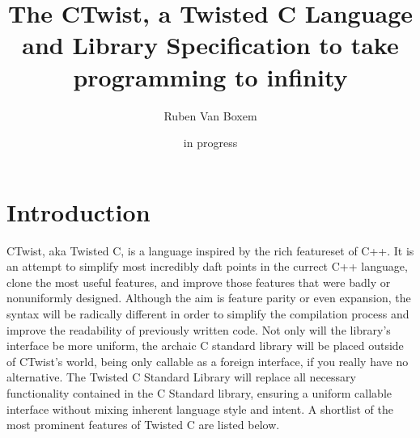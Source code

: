 \documentclass[a4paper,11pt]{article}
\title{The CTwist, a Twisted C Language and Library Specification to take programming to infinity}
\date{in progress}
\author{Ruben Van Boxem}
\begin{document}
\maketitle

\newpage

\tableofcontents
\thispagestyle{empty}
\newpage

\section{Introduction}

CTwist, aka Twisted C, is a language inspired by the rich featureset of C++.
It is an attempt to simplify most incredibly daft points in the currect C++ language, clone the most useful features, and improve those features that were badly or nonuniformly designed.
Although the aim is feature parity or even expansion, the syntax will be radically different in order to simplify the compilation process and improve the readability of previously written code.
Not only will the library’s interface be more uniform, the archaic C standard library will be placed outside of CTwist’s world, being only callable as a foreign interface, if you really have no alternative.
The Twisted C Standard Library will replace all necessary functionality contained in the C Standard library, ensuring a uniform callable interface without mixing inherent language style and intent.
A shortlist of the most prominent features of Twisted C are listed below.
\end{document}

